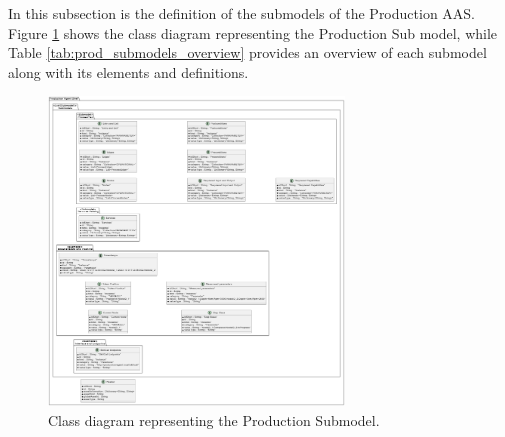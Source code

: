 In this subsection is the definition of the submodels of the Production AAS.
Figure \ref{fig:prod_submodel_classes} shows the class diagram representing the Production Sub
model, while Table \ref{tab:prod_submodels_overview} provides an overview of each submodel along with its elements and definitions.
\begin{figure}[ht]  
    \centering
    \includegraphics[width=0.7\textwidth]{Images/Production_Classes/Submodels.png}
    \caption{Class diagram representing the Production Submodel.}
    \label{fig:prod_submodel_classes}
\end{figure}

